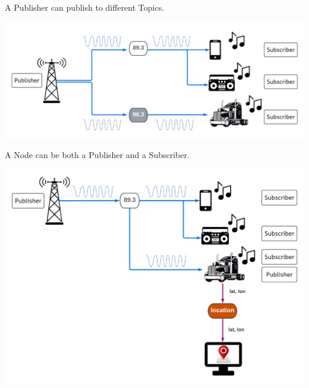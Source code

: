 \documentclass[usenames,11,dvipsnames,svgnames,x11names,aspectratio=1610,bibref]{beamer}
\newcommand{\mydisclaimer}{{\color{disclaimer}{\footnotesize Lecture 1~}}}
\renewcommand\sec{{\cnordSix{\secname}\hfill\mydisclaimer} }
\begin{document}
\begin{frame}[fragile]{\sec}
\vspace*{\fill}
\begin{center} 
A Publisher can publish to different Topics.

\includegraphics[width=.8\linewidth]{figures/lecture2/analogy8.pdf}

\end{center}
\vspace*{\fill}
\end{frame}



\begin{frame}[fragile]{\sec}
\vspace*{\fill}
\begin{center} 
A Node can be both a Publisher and a Subscriber.

\includegraphics[width=.7\linewidth]{figures/lecture2/analogy9.pdf}

\end{center}
\vspace*{\fill}
\end{frame}


\end{document}
